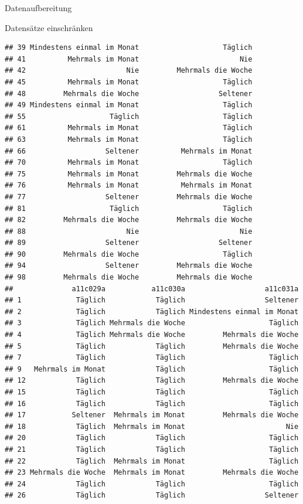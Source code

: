 \documentclass[ignorenonframetext,]{beamer}
\begin{document}
\begin{frame}[fragile]{Datenaufbereitung}
\begin{block}{Datensätze einschränken}
\begin{verbatim}
## 39 Mindestens einmal im Monat                    Täglich
## 41          Mehrmals im Monat                        Nie
## 42                        Nie         Mehrmals die Woche
## 45          Mehrmals im Monat                    Täglich
## 48         Mehrmals die Woche                   Seltener
## 49 Mindestens einmal im Monat                    Täglich
## 55                    Täglich                    Täglich
## 61          Mehrmals im Monat                    Täglich
## 63          Mehrmals im Monat                    Täglich
## 66                   Seltener          Mehrmals im Monat
## 70          Mehrmals im Monat                    Täglich
## 75          Mehrmals im Monat         Mehrmals die Woche
## 76          Mehrmals im Monat          Mehrmals im Monat
## 77                   Seltener         Mehrmals die Woche
## 81                    Täglich                    Täglich
## 82         Mehrmals die Woche         Mehrmals die Woche
## 88                        Nie                        Nie
## 89                   Seltener                   Seltener
## 90         Mehrmals die Woche                    Täglich
## 94                   Seltener         Mehrmals die Woche
## 98         Mehrmals die Woche         Mehrmals die Woche
##              a11c029a           a11c030a                   a11c031a
## 1             Täglich            Täglich                   Seltener
## 2             Täglich            Täglich Mindestens einmal im Monat
## 3             Täglich Mehrmals die Woche                    Täglich
## 4             Täglich Mehrmals die Woche         Mehrmals die Woche
## 5             Täglich            Täglich         Mehrmals die Woche
## 7             Täglich            Täglich                    Täglich
## 9   Mehrmals im Monat            Täglich                    Täglich
## 12            Täglich            Täglich         Mehrmals die Woche
## 15            Täglich            Täglich                    Täglich
## 16            Täglich            Täglich                    Täglich
## 17           Seltener  Mehrmals im Monat         Mehrmals die Woche
## 18            Täglich  Mehrmals im Monat                        Nie
## 20            Täglich            Täglich                    Täglich
## 21            Täglich            Täglich                    Täglich
## 22            Täglich  Mehrmals im Monat                    Täglich
## 23 Mehrmals die Woche  Mehrmals im Monat         Mehrmals die Woche
## 24            Täglich            Täglich                    Täglich
## 26            Täglich            Täglich                   Seltener

\end{verbatim}
\end{block}
\end{frame}
\end{document}
